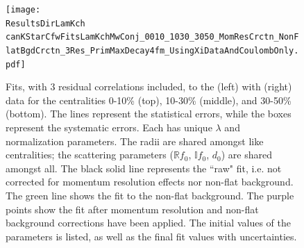 \documentclass[../AnalysisNoteJBuxton.tex]{subfiles}
\begin{document}
\begin{figure}[h]
  \centering
  \texttt{[image: \\ResultsDirLamKch canKStarCfwFitsLamKchMwConj\_0010\_1030\_3050\_MomResCrctn\_NonFlatBgdCrctn\_3Res\_PrimMaxDecay4fm\_UsingXiDataAndCoulombOnly.pdf]}
  \caption[\LamKchMALamKchP Fits with 3 Residuals]{Fits, with 3 residual correlations included, to the \LamKchM(left) with \ALamKchP (right) data for the centralities 0-10\% (top), 10-30\% (middle), and 30-50\% (bottom).
The lines represent the statistical errors, while the boxes represent the systematic errors.  
Each has unique $\lambda$ and normalization parameters.
The radii are shared amongst like centralities; the scattering parameters ($\mathbb{R}f_{0}$, $\mathbb{I}f_{0}$, $d_{0}$) are shared amongst all.
The black solid line represents the ``raw" fit, i.e. not corrected for momentum resolution effects nor non-flat background.  
The green line shows the fit to the non-flat background.
The purple points show the fit after momentum resolution and non-flat background corrections have been applied.
The initial values of the parameters is listed, as well as the final fit values with uncertainties.}
  \label{fig:LamKchMwConjFits_3Res}
\end{figure}

\end{document}

